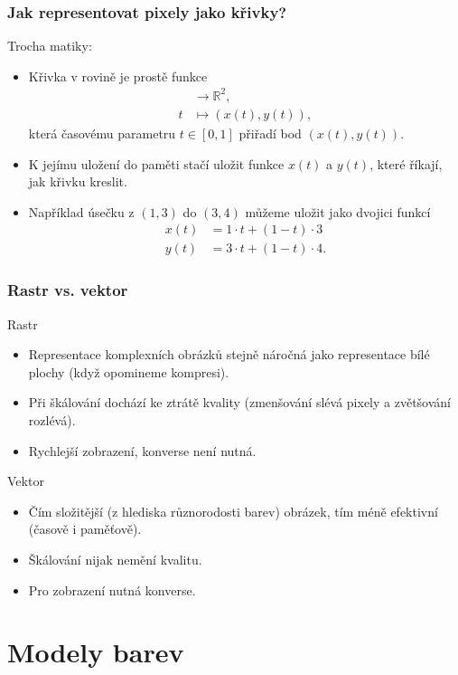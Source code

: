 \documentclass[aspectratio=169,11pt,svgnames]{beamer}
\begin{document}
\begin{frame}
  \frametitle{Jak representovat pixely jako křivky?}
  Trocha matiky:
  \begin{itemize}[label=\textbullet]
   \item Křivka v rovině je prostě funkce
   \begin{align*}
     [0,1] &\to \mathbb{R}^2,\\
     t &\mapsto (x(t), y(t)),
   \end{align*}
   která časovému parametru $t \in [0,1]$ přiřadí bod $(x(t), y(t))$.
  \pause
  \item K jejímu uložení do paměti stačí uložit funkce $x(t)$ a $y(t)$, které
    říkají, jak křivku kreslit.
  \pause
  \item Například úsečku z $(1,3)$ do $(3,4)$ můžeme uložit jako dvojici funkcí
  \begin{align*}
    x(t) &= 1 \cdot t + (1 - t) \cdot 3\\
    y(t) &= 3 \cdot t + (1 - t) \cdot 4.
  \end{align*}
  \end{itemize}
\end{frame}

\begin{frame}
  \frametitle{Rastr vs. vektor}
  \alert{Rastr}
  \begin{itemize}[label=\textbullet]
   \item Representace komplexních obrázků stejně náročná jako representace bílé
     plochy (když opomineme kompresi).
    \pause 
  \item Při škálování dochází ke ztrátě kvality (zmenšování slévá pixely a
    zvětšování rozlévá).
  \pause
  \item Rychlejší zobrazení, konverse není nutná.
  \end{itemize}
  \pause
  \alert{Vektor}
  \begin{itemize}[label=\textbullet]
    \item Čím složitější (z hlediska různorodosti barev) obrázek, tím méně
      efektivní (časově i paměťově).
    \pause
    \item Škálování nijak nemění kvalitu.
    \pause
    \item Pro zobrazení nutná konverse.
  \end{itemize}
\end{frame}

\section{Modely barev}
\label{sec:modely-barev}
\end{document}
